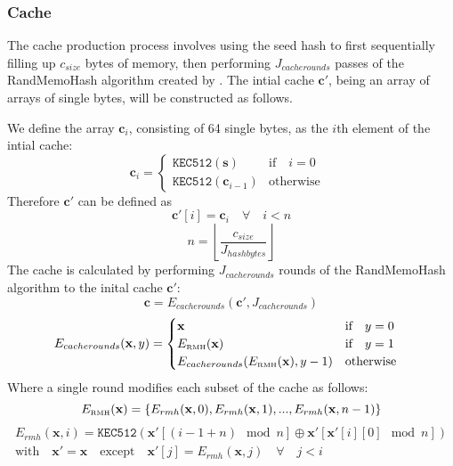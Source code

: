 \documentclass[9pt,oneside]{amsart}
\begin{document}
\subsubsection{Cache}
The cache production process involves using the seed hash to first sequentially filling up $c_{size}$ bytes of memory, then performing $J_{cacherounds}$ passes of the RandMemoHash algorithm created by \cite{lerner2014randmemohash}. The intial cache $\mathbf{c'}$, being an array of arrays of single bytes, will be constructed as follows.

We define the array $\mathbf{c}_{i}$, consisting of 64 single bytes,  as the $i$th element of the intial cache:
\begin{equation}
 \mathbf{c}_{i} = \begin{cases}
\texttt{KEC512}(\mathbf{s}) & \text{if} \quad i = 0 \quad  \\
\texttt{KEC512}(\mathbf{c}_{i-1}) & \text{otherwise}
\end{cases}
\end{equation}
Therefore $ \mathbf{c'}$ can be defined as 
\begin{equation}
 \mathbf{c'}[i] = \mathbf{c}_{i} \quad \forall \quad i < n
\end{equation}
\begin{equation}
 n = \left\lfloor\frac{c_{size}}{J_{hashbytes}}\right\rfloor
\end{equation}
The cache is calculated by performing $J_{cacherounds}$ rounds of the RandMemoHash algorithm to the inital cache $\mathbf{c'}$:
\begin{equation}
 \mathbf{c} = E_{cacherounds}(\mathbf{c'}, J_{cacherounds})
\end{equation}
\begin{equation}
 E_{cacherounds}(\mathbf{x}, y) = \begin{cases}
\mathbf{x} & \text{if} \quad y = 0 \quad  \\
E_\text{\tiny RMH}(\mathbf{x}) & \text{if} \quad y = 1 \quad  \\
E_{cacherounds}(E_\text{\tiny RMH}(\mathbf{x}), y -1 ) & \text{otherwise}
\end{cases}
\end{equation}
Where a single round modifies each subset of the cache as follows:
\begin{equation}
 E_\text{\tiny RMH}(\mathbf{x}) = \lbrace E_{rmh}(\mathbf{x}, 0), E_{rmh}(\mathbf{x}, 1), ... , E_{rmh}(\mathbf{x}, n - 1) \rbrace
\end{equation}
\begin{multline}
  E_{rmh}(\mathbf{x}, i) = \texttt{KEC512}(\mathbf{x'}[(i - 1 + n) \mod n] \oplus \mathbf{x'}[\mathbf{x'}[i][0] \mod n]) \\
  \text{with} \quad \mathbf{x'} = \mathbf{x} \quad \text{except} \quad \mathbf{x'}[j] = E_{rmh}(\mathbf{x}, j) \quad \forall \quad j < i
\end{multline}
\end{document}

